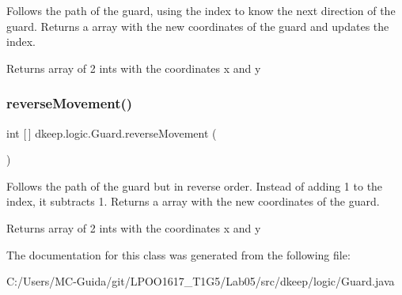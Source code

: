 Follows the path of the guard, using the index to know the next direction of the guard. Returns a array with the new coordinates of the guard and updates the index. \begin{DoxyReturn}{Returns}
array of 2 ints with the coordinates x and y 
\end{DoxyReturn}
\mbox{\label{classdkeep_1_1logic_1_1_guard_a8c588aa887fcfe6d3e4a9e13d236c644}} 
\subsubsection{\texorpdfstring{reverse\+Movement()}{reverseMovement()}}
{\footnotesize\ttfamily int \mbox{[}$\,$\mbox{]} dkeep.\+logic.\+Guard.\+reverse\+Movement (\begin{DoxyParamCaption}{ }\end{DoxyParamCaption})}

Follows the path of the guard but in reverse order. Instead of adding 1 to the index, it subtracts 1. Returns a array with the new coordinates of the guard.

\begin{DoxyReturn}{Returns}
array of 2 ints with the coordinates x and y 
\end{DoxyReturn}


The documentation for this class was generated from the following file\+:\begin{DoxyCompactItemize}
\item 
C\+:/\+Users/\+M\+C-\/\+Guida/git/\+L\+P\+O\+O1617\+\_\+\+T1\+G5/\+Lab05/src/dkeep/logic/Guard.\+java\end{DoxyCompactItemize}
